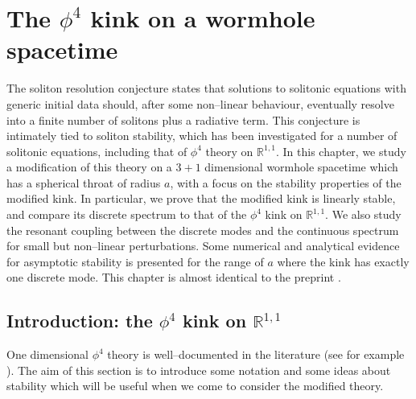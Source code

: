 \chapter{The $\phi^4$ kink on a wormhole spacetime} \label{chap:wormhole}


\graphicspath{{Chapter5/Figs/Static/}{Chapter5/Figs/Dynamic/}}



The soliton resolution conjecture \cite{TT} states that solutions to solitonic equations with generic initial data should, after some non--linear behaviour, eventually resolve into a finite number of solitons plus a radiative term. This conjecture is intimately tied to soliton stability, which has been investigated for a number of solitonic equations, including that of $\phi^4$ theory on $\mathbb{R}^{1,1}$. In this chapter, we study a modification of this theory on a $3+1$ dimensional wormhole spacetime which has a spherical throat of radius $a$, with a focus on the stability properties of the modified kink. In particular, we prove that the modified kink is linearly stable, and compare its discrete spectrum to that of the $\phi^4$ kink on $\mathbb{R}^{1,1}$. We also study the resonant coupling between the discrete modes and the continuous spectrum for small but non--linear perturbations. Some numerical and analytical evidence for asymptotic stability is presented for the range of $a$ where the kink has exactly one discrete mode. This chapter is almost identical to the preprint \cite{me}.

\section{Introduction: the $\phi^4$ kink on $\mathbb{R}^{1,1}$}

One dimensional $\phi^4$ theory is well--documented in the literature (see for example \cite{Manton&Sutcliffe}). The aim of this section is to introduce some notation and some ideas about stability which will be useful when we come to consider the modified theory.

